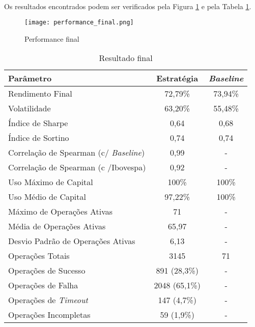 
\paragraph{} Os resultados encontrados podem ser verificados pela Figura \ref{fig:250} e pela Tabela \ref{tab:13}.

\begin{figure}[!htb]
    \texttt{[image: performance\_final.png]}
    \centering
    \caption{Performance final}
    \label{fig:250}
\end{figure}

\begin{table}[h!] %
    \begin{center}
        \begin{tabular}{ l|c|c }
            Parâmetro & Estratégia & \textit{Baseline} \\
            \hline
            Rendimento Final & 72,79\% & 73,94\% \\
            Volatilidade & 63,20\% & 55,48\% \\
            Índice de Sharpe & 0,64 & 0,68 \\
            Índice de Sortino & 0,74 & 0,74 \\
            Correlação de Spearman (c/ \textit{Baseline}) & 0,99 & - \\
            Correlação de Spearman (c /Ibovespa) & 0,92 & - \\
            Uso Máximo de Capital & 100\% & 100\% \\
            Uso Médio de Capital & 97,22\% & 100\% \\
            Máximo de Operações Ativas & 71 & - \\
            Média de Operações Ativas & 65,97 & - \\
            Desvio Padrão de Operações Ativas & 6,13 & -\\
            Operações Totais & 3145 & 71 \\
            Operações de Sucesso & 891 (28,3\%) & - \\
            Operações de Falha & 2048 (65,1\%) & - \\
            Operações de \textit{Timeout} & 147 (4,7\%) & - \\
            Operações Incompletas & 59 (1,9\%) & - \\
        \end{tabular}
        \caption{Resultado final}
        \label{tab:13}
    \end{center}
\end{table}

